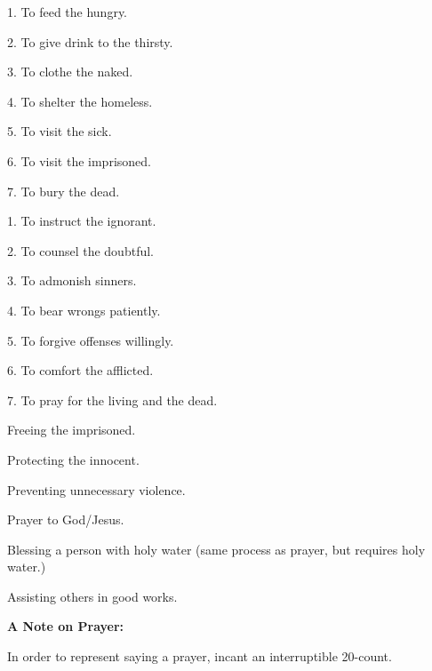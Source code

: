 \documentclass[green]{guildcamp4}
\begin{document}
\begin{itemz}
	\item 1. To feed the hungry.
	\item 2. To give drink to the thirsty.
	\item 3. To clothe the naked.
	\item 4. To shelter the homeless.
	\item 5. To visit the sick.
	\item 6. To visit the imprisoned.
	\item 7. To bury the dead.
\end{itemz}

\begin{itemz}
	\item 1. To instruct the ignorant.
	\item 2. To counsel the doubtful.
	\item 3. To admonish sinners.
	\item 4. To bear wrongs patiently.
	\item 5. To forgive offenses willingly.
	\item 6. To comfort the afflicted.
	\item 7. To pray for the living and the dead.
\end{itemz}

\begin{itemz}
	\item Freeing the imprisoned.
	\item Protecting the innocent.
	\item Preventing unnecessary violence.
	\item Prayer to God/Jesus.
	\item Blessing a person with holy water (same process as prayer, but requires holy water.)
	\item Assisting others in good works.
\end{itemz}

{\bf A Note on Prayer:}

In order to represent saying a prayer, incant an interruptible 20-count.
\end{document}
